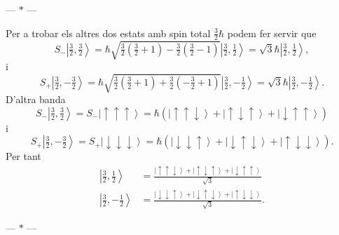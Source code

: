 \documentclass[12pt]{article}
\numberwithin{table}{section}
\numberwithin{figure}{section}
\numberwithin{equation}{section}
\renewcommand{\up}{\uparrow}
\newcommand{\down}{\downarrow}
\newcommand{\ket}[1]{\left\vert {#1} \right\rangle}
\newcommand{\parbreak}{
	\begin{center}
		--- $\ast$ ---
	\end{center} 
}
\begin{document}
\parbreak

Per a trobar els altres dos estats amb spin total \( \frac{3}{2}\hbar \) podem fer servir que
\begin{equation*}
	S_- \ket{\tfrac{3}{2}, \tfrac{3}{2}} = \hbar \sqrt{\tfrac{3}{2}\left(\tfrac{3}{2} + 1\right) - \tfrac{3}{2}\left(\tfrac{3}{2} - 1\right)}\ket{\tfrac{3}{2}, \tfrac{1}{2}} = \sqrt{3}\hbar \ket{\tfrac{3}{2}, \tfrac{1}{2}},
\end{equation*}
i
\begin{equation*}
	S_+ \ket{\tfrac{3}{2}, -\tfrac{3}{2}} = \hbar \sqrt{\tfrac{3}{2}\left(\tfrac{3}{2} + 1\right) + \tfrac{3}{2}\left(- \tfrac{3}{2} + 1\right)}\ket{\tfrac{3}{2}, -\tfrac{1}{2}} = \sqrt{3}\hbar \ket{\tfrac{3}{2}, -\tfrac{1}{2}}.
\end{equation*}
D'altra banda
\begin{equation*}
	S_- \ket{\tfrac{3}{2}, \tfrac{3}{2}} = S_-\ket{\up\up\up} = \hbar\left(\ket{\up\up\down} + \ket{\up\down\up} + \ket{\down\up\up}\right)
\end{equation*}
i
\begin{equation*}
	S_+ \ket{\tfrac{3}{2}, -\tfrac{3}{2}} = S_+\ket{\down\down\down} = \hbar\left(\ket{\down\down\up} + \ket{\down\up\down} + \ket{\up\down\down}\right).
\end{equation*}
Per tant
\begin{align*}
	\ket{\tfrac{3}{2}, \tfrac{1}{2}} & = \frac{\ket{\up\up\down} + \ket{\up\down\up} + \ket{\down\up\up}}{\sqrt{3}} \\
	\ket{\tfrac{3}{2}, -\tfrac{1}{2}} & = \frac{\ket{\down\down\up} + \ket{\down\up\down} + \ket{\up\down\down}}{\sqrt{3}}.
\end{align*}

\parbreak
\end{document}
